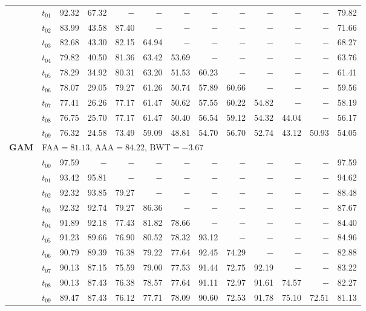 \begin{table}[ht]
\begin{tabular}{@{}l l r r r r r r r r r r r@{}}
 & $t_{01}$ & 92.32 & 67.32 & $-$ & $-$ & $-$ & $-$ & $-$ & $-$ & $-$ & $-$ & 79.82 \\
 & $t_{02}$ & 83.99 & 43.58 & 87.40 & $-$ & $-$ & $-$ & $-$ & $-$ & $-$ & $-$ & 71.66 \\
 & $t_{03}$ & 82.68 & 43.30 & 82.15 & 64.94 & $-$ & $-$ & $-$ & $-$ & $-$ & $-$ & 68.27 \\
 & $t_{04}$ & 79.82 & 40.50 & 81.36 & 63.42 & 53.69 & $-$ & $-$ & $-$ & $-$ & $-$ & 63.76 \\
 & $t_{05}$ & 78.29 & 34.92 & 80.31 & 63.20 & 51.53 & 60.23 & $-$ & $-$ & $-$ & $-$ & 61.41 \\
 & $t_{06}$ & 78.07 & 29.05 & 79.27 & 61.26 & 50.74 & 57.89 & 60.66 & $-$ & $-$ & $-$ & 59.56 \\
 & $t_{07}$ & 77.41 & 26.26 & 77.17 & 61.47 & 50.62 & 57.55 & 60.22 & 54.82 & $-$ & $-$ & 58.19 \\
 & $t_{08}$ & 76.75 & 25.70 & 77.17 & 61.47 & 50.40 & 56.54 & 59.12 & 54.32 & 44.04 & $-$ & 56.17 \\
 & $t_{09}$ & 76.32 & 24.58 & 73.49 & 59.09 & 48.81 & 54.70 & 56.70 & 52.74 & 43.12 & 50.93 & 54.05 \\
\midrule
\multirow{11}{*}{\textbf{GAM}} & \multicolumn{12}{l}{\quad\small FAA$=81.13$,\; AAA$=84.22$,\; BWT$=-3.67$} \\
 & $t_{00}$ & 97.59 & $-$ & $-$ & $-$ & $-$ & $-$ & $-$ & $-$ & $-$ & $-$ & 97.59 \\
 & $t_{01}$ & 93.42 & 95.81 & $-$ & $-$ & $-$ & $-$ & $-$ & $-$ & $-$ & $-$ & 94.62 \\
 & $t_{02}$ & 92.32 & 93.85 & 79.27 & $-$ & $-$ & $-$ & $-$ & $-$ & $-$ & $-$ & 88.48 \\
 & $t_{03}$ & 92.32 & 92.74 & 79.27 & 86.36 & $-$ & $-$ & $-$ & $-$ & $-$ & $-$ & 87.67 \\
 & $t_{04}$ & 91.89 & 92.18 & 77.43 & 81.82 & 78.66 & $-$ & $-$ & $-$ & $-$ & $-$ & 84.40 \\
 & $t_{05}$ & 91.23 & 89.66 & 76.90 & 80.52 & 78.32 & 93.12 & $-$ & $-$ & $-$ & $-$ & 84.96 \\
 & $t_{06}$ & 90.79 & 89.39 & 76.38 & 79.22 & 77.64 & 92.45 & 74.29 & $-$ & $-$ & $-$ & 82.88 \\
 & $t_{07}$ & 90.13 & 87.15 & 75.59 & 79.00 & 77.53 & 91.44 & 72.75 & 92.19 & $-$ & $-$ & 83.22 \\
 & $t_{08}$ & 90.13 & 87.43 & 76.38 & 78.57 & 77.64 & 91.11 & 72.97 & 91.61 & 74.57 & $-$ & 82.27 \\
 & $t_{09}$ & 89.47 & 87.43 & 76.12 & 77.71 & 78.09 & 90.60 & 72.53 & 91.78 & 75.10 & 72.51 & 81.13 \\

\end{tabular}
\end{table}
